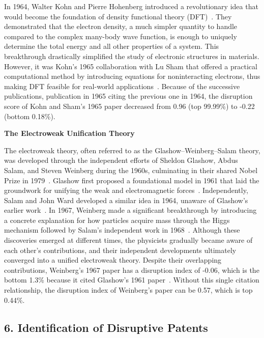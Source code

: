 \documentclass[12pt]{article}
\begin{document}
\begin{refsection}
In 1964, Walter Kohn and Pierre Hohenberg introduced a revolutionary idea that would become the foundation of density functional theory (DFT)~\cite{hohenberg1964inhomogeneous}. They demonstrated that the electron density, a much simpler quantity to handle compared to the complex many-body wave function, is enough to uniquely determine the total energy and all other properties of a system. This breakthrough drastically simplified the study of electronic structures in materials. However, it was Kohn’s 1965 collaboration with Lu Sham that offered a practical computational method by introducing equations for noninteracting electrons, thus making DFT feasible for real-world applications~\cite{PhysRevFocus1998, kohn1965self}. Because of the successive publications, publication in 1965 citing the previous one in 1964, the disruption score of Kohn and Sham’s 1965 paper decreased from 0.96 (top 99.99\%) to -0.22 (bottom 0.18\%).

\normalsize
\textbf{The Electroweak Unification Theory}

The electroweak theory, often referred to as the Glashow–Weinberg–Salam theory, was developed through the independent efforts of Sheldon Glashow, Abdus Salam, and Steven Weinberg during the 1960s, culminating in their shared Nobel Prize in 1979~\cite{Nobel1979}. Glashow first proposed a foundational model in 1961 that laid the groundwork for unifying the weak and electromagnetic forces~\cite{glashow1961partial}. Independently, Salam and John Ward developed a similar idea in 1964, unaware of Glashow’s earlier work~\cite{Salam1964}. In 1967, Weinberg made a significant breakthrough by introducing a concrete explanation for how particles acquire mass through the Higgs mechanism followed by Salam’s independent work in 1968~\cite{weinberg1967model, Salam1968}. Although these discoveries emerged at different times, the physicists gradually became aware of each other's contributions, and their independent developments ultimately converged into a unified electroweak theory. Despite their overlapping contributions, Weinberg's 1967 paper has a disruption index of -0.06, which is the bottom 1.3\% because it cited Glashow's 1961 paper~\cite{glashow1961partial}. Without this single citation relationship, the disruption index of Weinberg's paper can be 0.57, which is top 0.44\%.



\subsection*{6. Identification of Disruptive Patents}
\label{suppinfo:patent}


\end{refsection}
\end{document}
